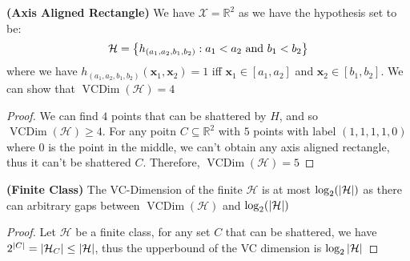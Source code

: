 \begin{proposition}{\textbf{(Axis Aligned Rectangle)}}
    We have $\mathcal{X} = \mathbb{R}^2$ as we have the hypothesis set to be:
    \begin{equation*}
        \mathcal{H} = \left\{ h_{(a_1,a_2,b_1,b_2)} : a_1<a_2 \text{ and } b_1<b_2 \right\}
    \end{equation*}
    where we have $h_{(a_1,a_2,b_1,b_2)}(\boldsymbol x_1, \boldsymbol x_2) = 1$ iff $\boldsymbol x_1 \in [a_1, a_2]$ and $\boldsymbol x_2 \in [b_1, b_2]$. We can show that $\operatorname{VCDim}(\mathcal{H})= 4$
\end{proposition}
\begin{proof}
    We can find $4$ points that can be shattered by $H$, and so $\operatorname{VCDim}(\mathcal{H}) \ge 4$. For any poitn $C\subseteq \mathbb{R}^2$ with $5$ points with label $(1,1,1,1,0)$ where $0$ is the point in the middle, we can't obtain any axis aligned rectangle, thus it can't be shattered $C$. Therefore, $\operatorname{VCDim}(\mathcal{H}) = 5$
\end{proof}

\begin{proposition}{\textbf{(Finite Class)}}
    The VC-Dimension of the finite $\mathcal{H}$ is at most $\log_2(\left| \mathcal{H} \right|)$ as there can arbitrary gaps between $\operatorname{VCDim}(\mathcal{H})$ and $\log_2(\left| \mathcal{H} \right|)$
\end{proposition}
\begin{proof}
    Let $\mathcal{H}$ be a finite class, for any set $C$ that can be shattered, we have $2^{|C|} = |\mathcal{H}_C| \le \left| \mathcal{H} \right|$, thus the upperbound of the VC dimension is $\log_2\left| \mathcal{H} \right|$
\end{proof}

